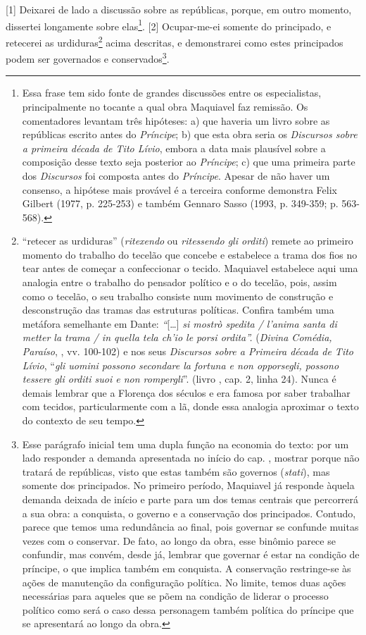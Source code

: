 {[}1{]} Deixarei de lado a discussão sobre as repúblicas, porque, em
outro momento, dissertei longamente sobre elas\footnote{Essa frase tem
  sido fonte de grandes discussões entre os especialistas,
  principalmente no tocante a qual obra Maquiavel faz remissão. Os
  comentadores levantam três hipóteses: a) que haveria um livro sobre as
  repúblicas escrito antes do \emph{Príncipe}; b) que esta obra seria os
  \emph{Discursos sobre a primeira década de Tito Lívio}, embora a data
  mais plausível sobre a composição desse texto seja posterior ao
  \emph{Príncipe}; c) que uma primeira parte dos \emph{Discursos} foi
  composta antes do \emph{Príncipe}. Apesar de não haver um consenso, a
  hipótese mais provável é a terceira conforme demonstra Felix Gilbert
  (1977, p. 225-253) e também Gennaro Sasso (1993, p. 349-359; p.
  563-568).}. {[}2{]} Ocupar-me-ei somente do principado, e retecerei as
urdiduras\footnote{``retecer as urdiduras'' (\emph{ritexendo} ou
  \emph{ritessendo gli orditi}) remete ao primeiro momento do trabalho
  do tecelão que concebe e estabelece a trama dos fios no tear antes de
  começar a confeccionar o tecido. Maquiavel estabelece aqui uma
  analogia entre o trabalho do pensador político e o do tecelão, pois,
  assim como o tecelão, o seu trabalho consiste num movimento de
  construção e desconstrução das tramas das estruturas políticas.
  Confira também uma metáfora semelhante em Dante: \emph{``}{[}\ldots{}{]}
  \emph{si mostrò spedita / l'anima santa di metter la trama / in quella
  tela ch'io le porsi ordita''.} (\emph{Divina Comédia, Paraíso}, ,
  vv. 100-102) e nos seus \emph{Discursos sobre a Primeira década de
  Tito Lívio}, ``\emph{gli uomini possono secondare la fortuna e non
  opporsegli, possono tessere gli orditi suoi e non rompergli}''. (livro
  , cap. 2, linha 24). Nunca é demais lembrar que a Florença dos
  séculos  e  era famosa por saber trabalhar com tecidos,
  particularmente com a lã, donde essa analogia aproximar o texto do
  contexto de seu tempo.} acima descritas, e demonstrarei como estes
principados podem ser governados e conservados\footnote{Esse parágrafo
  inicial tem uma dupla função na economia do texto: por um lado
  responder a demanda apresentada no início do cap. , mostrar porque
  não tratará de repúblicas, visto que estas também são governos
  (\emph{stati}), mas somente dos principados. No primeiro período,
  Maquiavel já responde àquela demanda deixada de início e parte para um
  dos temas centrais que percorrerá a sua obra: a conquista, o governo e
  a conservação dos principados. Contudo, parece que temos uma
  redundância ao final, pois governar se confunde muitas vezes com o
  conservar. De fato, ao longo da obra, esse binômio parece se
  confundir, mas convém, desde já, lembrar que governar é estar na
  condição de príncipe, o que implica também em conquista. A conservação
  restringe-se às ações de manutenção da configuração política. No
  limite, temos duas ações necessárias para aqueles que se põem na
  condição de liderar o processo político como será o caso dessa
  personagem também política do príncipe que se apresentará ao longo da
  obra.}.

